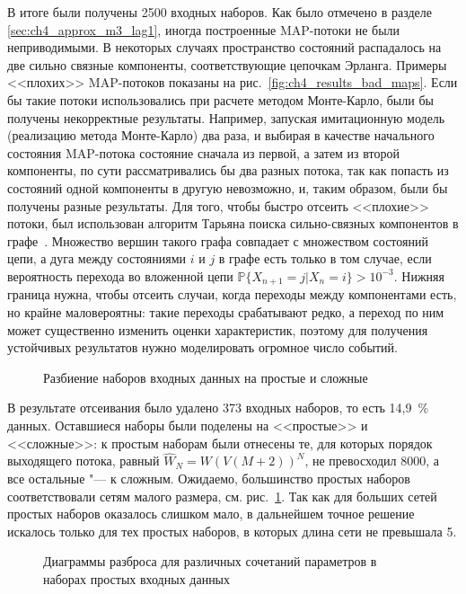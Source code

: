 В итоге были получены 2500 входных наборов. Как было отмечено в разделе \ref{sec:ch4_approx_m3_lag1}, иногда построенные MAP-потоки не были неприводимыми. В некоторых случаях пространство состояний распадалось на две сильно связные компоненты, соответствующие цепочкам Эрланга. Примеры <<плохих>> MAP-потоков показаны на рис.~\ref{fig:ch4_results_bad_maps}. Если бы такие потоки использовались при расчете методом Монте-Карло, были бы получены некорректные результаты. Например, запуская имитационную модель (реализацию метода Монте-Карло) два раза, и выбирая в качестве начального состояния MAP-потока состояние сначала из первой, а затем из второй компоненты, по сути рассматривались бы два разных потока, так как попасть из состояний одной компоненты в другую невозможно, и, таким образом, были бы получены разные результаты. Для того, чтобы быстро отсеить <<плохие>> потоки, был использован алгоритм Тарьяна поиска сильно-связных компонентов в графе~\cite{tarjan72}. Множество вершин такого графа совпадает с множеством состояний цепи, а дуга между состояниями $i$ и $j$ в графе есть только в том случае, если вероятность перехода во вложенной цепи $\mathbb{P}\{X_{n+1} = j | X_n = i\} > 10^{-3}$. Нижняя граница нужна, чтобы отсеить случаи, когда переходы между компонентами есть, но крайне маловероятны: такие переходы срабатывают редко, а переход по ним может существенно изменить оценки характеристик, поэтому для получения устойчивых результатов нужно моделировать огромное число событий.

\begin{figure}[h]
  \caption{Разбиение наборов входных данных на простые и сложные}\label{fig:ch4_complexity_split}
\end{figure}

В результате отсеивания было удалено 373 входных наборов, то есть 14,9~\% данных. Оставшиеся наборы были поделены на <<простые>> и <<сложные>>: к простым наборам были отнесены те, для которых порядок выходящего потока, равный $\hat{W}_N = W(V(M+2))^N$, не превосходил 8000, а все остальные "--- к сложным. Ожидаемо, большинство простых наборов соответствовали сетям малого размера, см. рис.~\ref{fig:ch4_complexity_split}. Так как для больших сетей простых наборов оказалось слишком мало, в дальнейшем точное решение искалось только для тех простых наборов, в которых длина сети не превышала 5.

\begin{figure}[h]
  \caption{Диаграммы разброса для различных сочетаний параметров в наборах простых входных данных}\label{fig:ch4_input_scatter}
\end{figure}


